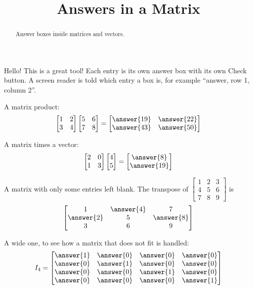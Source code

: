 \documentclass{ximera}
\title{Answers in a Matrix}
\begin{document}
\begin{abstract}
Answer boxes inside matrices and vectors.
\end{abstract}
\maketitle

Hello! This is a great tool! Each entry is its own answer box with its own Check button. A screen reader
is told which entry a box is, for example ``answer, row 1, column 2''. 

\begin{problem}
A matrix product:
\[
\begin{bmatrix} 1 & 2 \\ 3 & 4 \end{bmatrix}
\begin{bmatrix} 5 & 6 \\ 7 & 8 \end{bmatrix}
=
\begin{bmatrix} \answer{19} & \answer{22} \\ \answer{43} & \answer{50} \end{bmatrix}
\]
\end{problem}

\begin{problem}
A matrix times a vector:
\[
\begin{bmatrix} 2 & 0 \\ 1 & 3 \end{bmatrix}
\begin{bmatrix} 4 \\ 5 \end{bmatrix}
=
\begin{bmatrix} \answer{8} \\ \answer{19} \end{bmatrix}
\]
\end{problem}

\begin{problem}
A matrix with only some entries left blank. The transpose of
$\begin{bmatrix} 1 & 2 & 3 \\ 4 & 5 & 6 \\ 7 & 8 & 9 \end{bmatrix}$ is
\[
\begin{bmatrix} 1 & \answer{4} & 7 \\ \answer{2} & 5 & \answer{8} \\ 3 & 6 & 9 \end{bmatrix}
\]
\end{problem}

\begin{problem}
A wide one, to see how a matrix that does not fit is handled:
\[
I_4 =
\begin{bmatrix}
\answer{1} & \answer{0} & \answer{0} & \answer{0} \\
\answer{0} & \answer{1} & \answer{0} & \answer{0} \\
\answer{0} & \answer{0} & \answer{1} & \answer{0} \\
\answer{0} & \answer{0} & \answer{0} & \answer{1}
\end{bmatrix}
\]
\end{problem}
\end{document}
